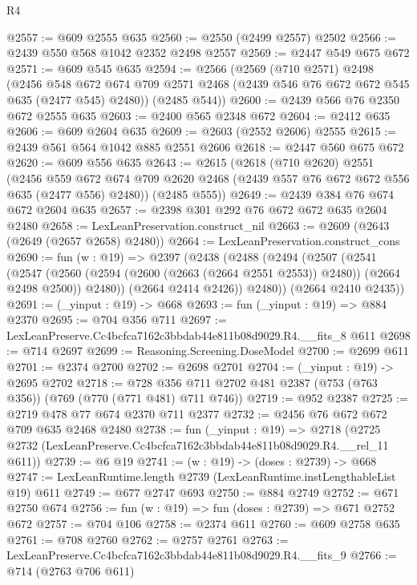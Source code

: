 \begin{lexlean}{R4}
\begin{coremodule}
@2557 := @609 @2555 @635
@2560 := @2550 (@2499 @2557) @2502
@2566 := @2439 @550 @568 @1042 @2352 @2498 @2557
@2569 := @2447 @549 @675 @672
@2571 := @609 @545 @635
@2594 := @2566
    (@2569
      (@710 @2571)
      @2498
      (@2456
        @548
        @672
        @674
        @709
        @2571
        @2468
        (@2439 @546 @76 @672 @672 @545 @635 (@2477 @545) @2480))
      (@2485 @544))
@2600 := @2439 @566 @76 @2350 @672 @2555 @635
@2603 := @2400 @565 @2348 @672
@2604 := @2412 @635
@2606 := @609 @2604 @635
@2609 := @2603 (@2552 @2606) @2555
@2615 := @2439 @561 @564 @1042 @885 @2551 @2606
@2618 := @2447 @560 @675 @672
@2620 := @609 @556 @635
@2643 := @2615
    (@2618
      (@710 @2620)
      @2551
      (@2456
        @559
        @672
        @674
        @709
        @2620
        @2468
        (@2439 @557 @76 @672 @672 @556 @635 (@2477 @556) @2480))
      (@2485 @555))
@2649 := @2439 @384 @76 @674 @672 @2604 @635
@2657 := @2398 @301 @292 @76 @672 @672 @635 @2604 @2480
@2658 := LexLeanPreservation.construct_nil
@2663 := @2609 (@2643 (@2649 (@2657 @2658) @2480))
@2664 := LexLeanPreservation.construct_cons
@2690 := fun (w : @19) =>
  @2397
    (@2438
      (@2488
        (@2494
          (@2507
            (@2541
              (@2547
                (@2560 (@2594 (@2600 (@2663 (@2664 @2551 @2553)) @2480)) (@2664 @2498 @2500))
                @2480))
            (@2664 @2414 @2426))
          @2480))
      (@2664 @2410 @2435))
@2691 := (_yinput : @19) -> @668
@2693 := fun (_yinput : @19) => @884 @2370
@2695 := @704 @356 @711
@2697 := LexLeanPreserve.Cc4bcfca7162c3bbdab44e811b08d9029.R4.__fits_8 @611
@2698 := @714 @2697
@2699 := Reasoning.Screening.DoseModel
@2700 := @2699 @611
@2701 := @2374 @2700
@2702 := @2698 @2701
@2704 := (_yinput : @19) -> @2695 @2702
@2718 := @728 @356 @711 @2702 @481 @2387 (@753 (@763 @356)) (@769 (@770 (@771 @481) @711 @746))
@2719 := @952 @2387
@2725 := @2719 @478 @77 @674 @2370 @711 @2377
@2732 := @2456 @76 @672 @672 @709 @635 @2468 @2480
@2738 := fun (_yinput : @19) =>
  @2718 (@2725 @2732 (LexLeanPreserve.Cc4bcfca7162c3bbdab44e811b08d9029.R4.__rel_11 @611))
@2739 := @6 @19
@2741 := (w : @19) -> (doses : @2739) -> @668
@2747 := LexLeanRuntime.length @2739 (LexLeanRuntime.instLengthableList @19) @611
@2749 := @677 @2747 @693
@2750 := @884 @2749
@2752 := @671 @2750 @674
@2756 := fun (w : @19) => fun (doses : @2739) => @671 @2752 @672
@2757 := @704 @106
@2758 := @2374 @611
@2760 := @609 @2758 @635
@2761 := @708 @2760
@2762 := @2757 @2761
@2763 := LexLeanPreserve.Cc4bcfca7162c3bbdab44e811b08d9029.R4.__fits_9
@2766 := @714 (@2763 @706 @611)

\end{coremodule}
\end{lexlean}

